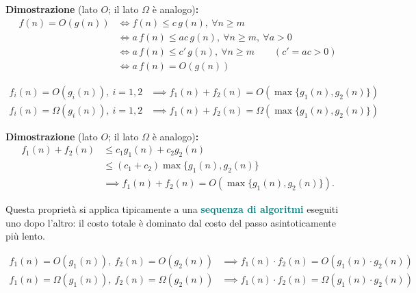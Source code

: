 \documentclass[12pt, a4paper]{article}
\begin{document}
\textbf{Dimostrazione} (lato $O$; il lato $\Omega$ è analogo)\textbf{:}
\begin{align*}
f(n) = O(g(n)) &\iff f(n) \le c\,g(n), \ \forall n \ge m \\
&\iff a\,f(n) \le ac\,g(n), \ \forall n \ge m,\ \forall a>0 \\
&\iff a\,f(n) \le c'\,g(n), \ \forall n \ge m \qquad (c' = ac > 0) \\
&\iff a\,f(n) = O(g(n))
\end{align*}

\begin{tcolorbox}[colback=lightergray!10, colframe=tocsec, title=\textbf{Proprietà: Sommatoria (Sequenza di Algoritmi)}]
\label{prop:sommatoria}
\begin{align*}
f_i(n) = O(g_i(n)),\ i=1,2 &\implies f_1(n)+f_2(n) = O(\max\{g_1(n),g_2(n)\}) \\
f_i(n) = \Omega(g_i(n)),\ i=1,2 &\implies f_1(n)+f_2(n) = \Omega(\max\{g_1(n),g_2(n)\})
\end{align*}
\end{tcolorbox}

\textbf{Dimostrazione} (lato $O$; il lato $\Omega$ è analogo)\textbf{:}
\begin{align*}
f_1(n)+f_2(n) &\le c_1 g_1(n) + c_2 g_2(n) \\
&\le (c_1+c_2)\max\{g_1(n),g_2(n)\} \\
&\implies f_1(n)+f_2(n) = O(\max\{g_1(n),g_2(n)\}).
\end{align*}

\begin{tcolorbox}[colback=lightergray!5, colframe=tocsubsec, title=\textbf{Osservazione}]
Questa proprietà si applica tipicamente a una \textcolor{teal}{\textbf{sequenza di algoritmi}} eseguiti uno dopo l'altro: il costo totale è dominato dal costo del passo asintoticamente più lento.
\end{tcolorbox}

\begin{tcolorbox}[colback=lightergray!10, colframe=tocsec, title=\textbf{Proprietà: Prodotto (Cicli Annidati)}]
\label{prop:prodotto}
\begin{align*}
f_1(n)=O(g_1(n)),\ f_2(n)=O(g_2(n)) &\implies f_1(n)\cdot f_2(n) = O(g_1(n)\cdot g_2(n)) \\
f_1(n)=\Omega(g_1(n)),\ f_2(n)=\Omega(g_2(n)) &\implies f_1(n)\cdot f_2(n) = \Omega(g_1(n)\cdot g_2(n))
\end{align*}
\end{tcolorbox}
\end{document}
